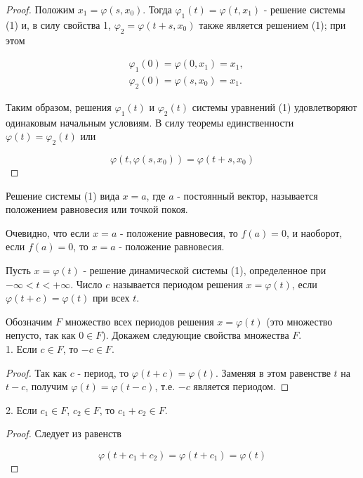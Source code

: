 \documentclass{article}
\theoremstyle{plain} \newtheorem*{theorem*}{Теорема}
\theoremstyle{plain} \newtheorem{theorem}{Теорема}[section]
\theoremstyle{definition} \newtheorem*{corollary*}{Следствие}
\theoremstyle{definition} \newtheorem{corollary}{Следствие}[section]
\begin{document}
\begin{proof}
Положим $x_1 = \varphi(s, x_0)$.
Тогда $\varphi_1(t) = \varphi(t, x_1)$ - решение системы (1) и,
в силу свойства 1, $\varphi_2 = \varphi(t + s, x_0)$
также является решением (1); при этом

\begin{align*}
    &\varphi_1(0) = \varphi(0, x_1) = x_1,\\
    &\varphi_2(0) = \varphi(s, x_0) = x_1.
\end{align*}

Таким образом, решения $\varphi_1(t)$ и $\varphi_2(t)$
системы уравнений (1) удовлетворяют
одинаковым начальным условиям. В силу теоремы единственности
$\varphi(t) = \varphi_2(t)$ или

\begin{equation*}
    \varphi(t, \varphi(s, x_0)) = \varphi(t + s, x_0)
\end{equation*}

\end{proof}

Решение системы (1) вида $x = a$, где $a$
- постоянный вектор, называется
положением равновесия или точкой покоя.

Очевидно, что если $x = a$ - положение равновесия,
то $f(a) = 0$, и наоборот,
если $f(a) = 0$, то $x = a$ - положение равновесия.

Пусть $x = \varphi(t)$ - решение динамической системы (1),
определенное при $- \infty < t < + \infty$.
Число $c$ называется периодом решения $x = \varphi(t)$,
если $\varphi(t + c) = \varphi(t)$ при всех $t$.

Обозначим $F$ множество всех периодов решения $x = \varphi(t)$
(это множество непусто, так как $0 \in F$).
Докажем следующие свойства множества $F$.
\\

1. Если $c \in F$, то $-c \in F$.
\begin{proof}
Так как $c$ - период, то $\varphi(t + c) = \varphi(t)$.
Заменяя в этом равенстве $t$ на $t - c$, получим
$\varphi(t) = \varphi(t - c)$, т.е. $-c$ является периодом.
\end{proof}

2. Если $c_1 \in F$, $c_2 \in F$, то $c_1 + c_2 \in F$.

\begin{proof}
Следует из равенств

\begin{equation*}
    \varphi(t + c_1 + c_2) = \varphi(t + c_1) = \varphi(t)
\end{equation*}

\end{proof}
\end{document}
